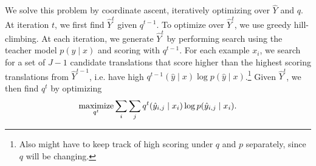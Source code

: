 \documentclass[11pt]{article}
\begin{document}
We solve this problem by coordinate ascent, iteratively optimizing over $\hat{Y}$ and $q$.
At iteration $t$, we first find $\hat{Y}^t$ given $q^{t-1}$.
To optimize over $\hat{Y}^t$, we use greedy hill-climbing.
At each iteration, we generate $\hat{Y}^t$
by performing search using the teacher model $p(y \mid x)$ and scoring with $q^{t-1}$.
For each example $x_i$, we search for a set of $J-1$ candidate translations that score higher
than the highest scoring translations from $\hat{Y}^{t-1}$,
i.e. have high $q^{t-1}(\hat{y} \mid x)\log p(\hat{y} \mid x)$.\footnote{
Also might have to keep track of high scoring under $q$ and $p$ separately,
since $q$ will be changing.
}
Given $\hat{Y}^t$, we then find $q^t$ by optimizing
\begin{equation}
    \operatorname*{maximize}_{q^t} \sum_i \sum_j q^t(\hat{y}_{i,j} \mid x_i) \log p(\hat{y}_{i,j} \mid x_i).
\end{equation}
\end{document}
